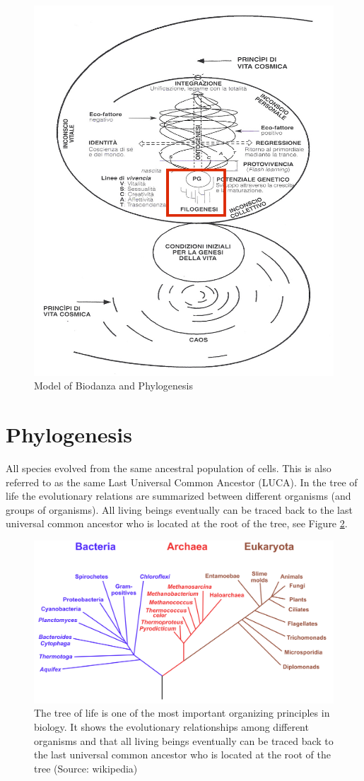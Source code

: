 \documentclass[
  11pt,
]{book}
\begin{document}
\begin{figure}

{\centering \includegraphics[width=0.5\linewidth]{./figs/biologischeAspectenBiodanzaDeelII} 

}

\caption{Model of Biodanza and Phylogenesis}\label{fig:modelPhylo}
\end{figure}

\hypertarget{phylogenesis}{%
\section{Phylogenesis}\label{phylogenesis}}

All species evolved from the same ancestral population of cells.
This is also referred to as the same Last Universal Common Ancestor (LUCA).
In the tree of life the evolutionary relations are summarized between different organisms (and groups of organisms). All living beings eventually can be traced back to the last universal common ancestor who is located at the root of the tree, see Figure \ref{fig:treeOfLifeBis}.

\begin{figure}

{\centering \includegraphics[width=1\linewidth]{./figs/Phylogenetic_tree} 

}

\caption{The tree of life is one of the most important organizing principles in biology. It shows the evolutionary relationships among different organisms and that all living beings eventually can be traced back to the last universal common ancestor who is located at the root of the tree (Source: wikipedia)}\label{fig:treeOfLifeBis}
\end{figure}
\end{document}

